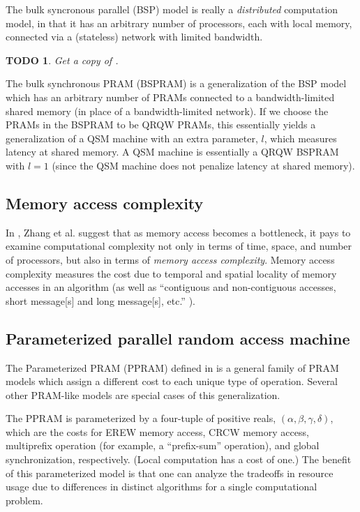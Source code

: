 \documentclass{article}
\newtheorem{todo}{TODO}
\begin{document}
The bulk syncronous parallel (BSP) \cite{valiant89} model is really a \emph{distributed} computation model, in that it has an arbitrary number of processors, each with local memory, connected via a (stateless) network with limited bandwidth.

\begin{todo}
  Get a copy of \cite{valiant89}.
\end{todo}

The bulk synchronous PRAM (BSPRAM) \cite{tiskin98} is a generalization of the BSP model which has an arbitrary number of PRAMs connected to a bandwidth-limited shared memory (in place of a bandwidth-limited network).
If we choose the PRAMs in the BSPRAM to be QRQW PRAMs, this essentially yields a generalization of a QSM machine with an extra parameter, $l$, which measures latency at shared memory.
A QSM machine is essentially a QRQW BSPRAM with $l=1$ (since the QSM machine does not penalize latency at shared memory).

\subsection{Memory access complexity}

In \cite{zstc98, zhang00}, Zhang et al. suggest that as memory access becomes a bottleneck, it pays to examine computational complexity not only in terms of time, space, and number of processors, but also in terms of \emph{memory access complexity}.
Memory access complexity measures the cost due to temporal and spatial locality of memory accesses in an algorithm (as well as ``contiguous and non-contiguous accesses, short message[s] and long message[s], etc.'' \cite{zcsm07}).

\subsection{Parameterized parallel random access machine}

The Parameterized PRAM (PPRAM) defined in \cite{hc} is a general family of PRAM models which assign a different cost to each unique type of operation.
Several other PRAM-like models are special cases of this generalization.

The PPRAM is parameterized by a four-tuple of positive reals, $(\alpha, \beta, \gamma, \delta)$, which are the costs for EREW memory access, CRCW memory access, multiprefix operation (for example, a ``prefix-sum'' operation), and global synchronization, respectively.
(Local computation has a cost of one.)
The benefit of this parameterized model is that one can analyze the tradeoffs in resource usage due to differences in distinct algorithms for a single computational problem.
\end{document}
